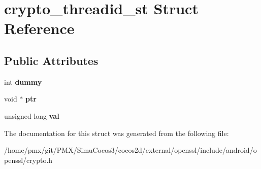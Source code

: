 \hypertarget{structcrypto__threadid__st}{}\section{crypto\+\_\+threadid\+\_\+st Struct Reference}
\label{structcrypto__threadid__st}
\subsection*{Public Attributes}
\begin{DoxyCompactItemize}
\item 
\mbox{\label{structcrypto__threadid__st_a40fe6e11147acb20162256b525dd8a07}} 
int {\bfseries dummy}
\item 
\mbox{\label{structcrypto__threadid__st_a682e95abcf3ddb87da11e9d64dc04e71}} 
void $\ast$ {\bfseries ptr}
\item 
\mbox{\label{structcrypto__threadid__st_ae211eb79aaff1a57eba548fb6fda0e2a}} 
unsigned long {\bfseries val}
\end{DoxyCompactItemize}


The documentation for this struct was generated from the following file\+:\begin{DoxyCompactItemize}
\item 
/home/pmx/git/\+P\+M\+X/\+Simu\+Cocos3/cocos2d/external/openssl/include/android/openssl/crypto.\+h\end{DoxyCompactItemize}
